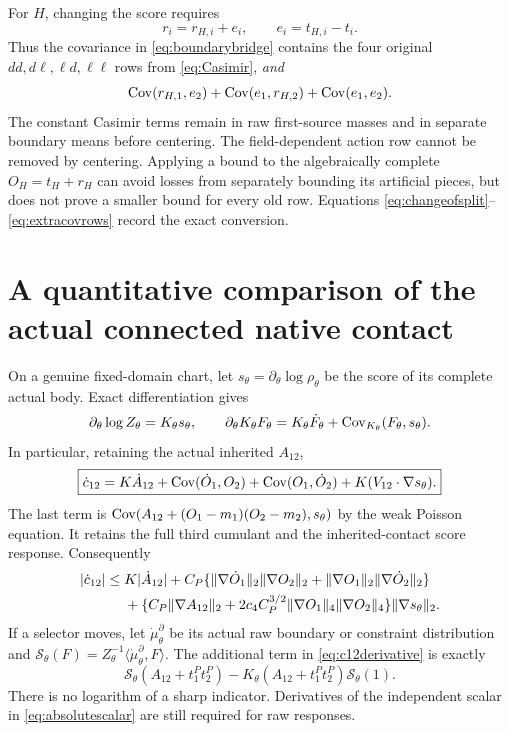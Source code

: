 \documentclass[11pt,letterpaper]{article}
\theoremstyle{plain}
\theoremstyle{remark}\newtheorem{remark}[theorem]{Scope}
\begin{document}
For $H$, changing the score requires
\begin{equation}
r_i=r_{H,i}+e_i,\qquad e_i=t_{H,i}-t_i.
\label{eq:effectivecorrection}
\end{equation}
Thus the covariance in \eqref{eq:boundarybridge} contains the four original
$dd,d\ell,\ell d,\ell\ell$ rows from \eqref{eq:Casimir}, \emph{and}
\begin{equation}
\operatorname{Cov}(r_{H,1},e_2)+\operatorname{Cov}(e_1,r_{H,2})+\operatorname{Cov}(e_1,e_2).
\label{eq:extracovrows}
\end{equation}
The constant Casimir terms remain in raw first-source masses and in separate
boundary means before centering. The field-dependent action row cannot be
removed by centering. Applying a bound to the algebraically complete
$O_H=t_H+r_H$ can avoid losses from separately bounding its artificial pieces,
but does not prove a smaller bound for every old row. Equations
\eqref{eq:changeofsplit}--\eqref{eq:extracovrows} record the exact conversion.

\section{A quantitative comparison of the actual connected native contact}
\label{sec:contactcomparison}

On a genuine fixed-domain chart, let $s_\theta=\partial_\theta\log\rho_\theta$
be the score of its complete actual body. Exact differentiation gives
\begin{equation}
\partial_\theta\log Z_\theta=K_\theta s_\theta,
\qquad
\partial_\theta K_\theta F_\theta
=K_\theta\dot F_\theta+\operatorname{Cov}_{K_\theta}(F_\theta,s_\theta).
\label{eq:parameterresponse}
\end{equation}
In particular, retaining the actual inherited $A_{12}$,
\begin{equation}
\boxed{\dot c_{12}=K\dot A_{12}
+\operatorname{Cov}(\dot O_1,O_2)+\operatorname{Cov}(O_1,\dot O_2)
+K(V_{12}\cdot\nabla s_\theta).}
\label{eq:c12derivative}
\end{equation}
The last term is
$\operatorname{Cov}(A_{12}+(O_1-m_1)(O_2-m_2),s_\theta)$ by the weak Poisson equation.
It retains the full third cumulant and the inherited-contact score response.
Consequently
\begin{align}
|\dot c_{12}|\le{}&K|\dot A_{12}|
+C_P\{\|\nabla\dot O_1\|_2\|\nabla O_2\|_2
+\|\nabla O_1\|_2\|\nabla\dot O_2\|_2\}\notag\\
&+\{C_P\|\nabla A_{12}\|_2
+2c_4C_P^{3/2}\|\nabla O_1\|_4\|\nabla O_2\|_4\}
\|\nabla s_\theta\|_2.
\label{eq:generalresponsebound}
\end{align}
If a selector moves, let $\dot\mu_\theta^\partial$ be its actual raw boundary
or constraint distribution and
$\mathcal S_\theta(F)=Z_\theta^{-1}\langle\dot\mu_\theta^\partial,F\rangle$.
The additional term in \eqref{eq:c12derivative} is exactly
\begin{equation}
\mathcal S_\theta(A_{12}+t_1^Pt_2^P)
-K_\theta(A_{12}+t_1^Pt_2^P)\mathcal S_\theta(1).
\label{eq:movingboundary}
\end{equation}
There is no logarithm of a sharp indicator. Derivatives of the independent scalar
in \eqref{eq:absolutescalar} are still required for raw responses.
\end{document}
